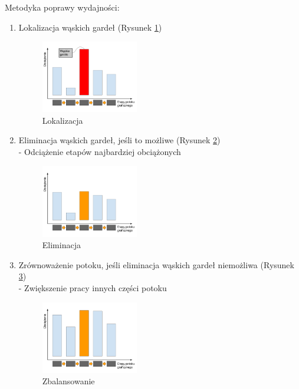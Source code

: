 \documentclass[a4paper,twoside,12pt]{book}
\begin{document}
\vbox{}

Metodyka poprawy wydajności: \cite{bib:game_dev_conference}
\begin{enumerate}
    \item Lokalizacja wąskich gardeł (Rysunek \ref{fig:bottleneck_locate}) \\
        \begin{figure}[H]
            \centering
            \includegraphics[width=0.4\textwidth]{res/bottleneck_locate.png}
            \caption{Lokalizacja}
            \label{fig:bottleneck_locate}
        \end{figure}
    \item Eliminacja wąskich gardeł, jeśli to możliwe (Rysunek \ref{fig:bottleneck_eliminate}) \\
        - Odciążenie etapów najbardziej obciążonych \\
        \begin{figure}[H]
            \centering
            \includegraphics[width=0.4\textwidth]{res/bottleneck_eliminate.png}
            \caption{Eliminacja}
            \label{fig:bottleneck_eliminate}
        \end{figure}
    \item Zrównoważenie potoku, jeśli eliminacja wąskich gardeł niemożliwa (Rysunek \ref{fig:bottleneck_balance}) \\
        - Zwiększenie pracy innych części potoku \\
        \begin{figure}[H]
            \centering
            \includegraphics[width=0.4\textwidth]{res/bottleneck_balance.png}
            \caption{Zbalansowanie}
            \label{fig:bottleneck_balance}
        \end{figure}
\end{enumerate}
\end{document}
